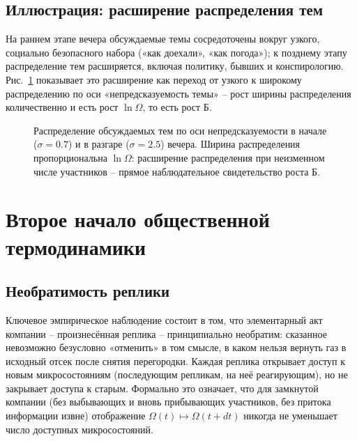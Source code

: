 \documentclass[11pt,a4paper]{article}
\newcommand{\Burm}{\text{Б}}
\begin{document}
\subsection{Иллюстрация: расширение распределения тем}

На раннем этапе вечера обсуждаемые темы сосредоточены вокруг узкого, социально безопасного набора («как доехали», «как погода»); к позднему этапу распределение тем расширяется, включая политику, бывших и конспирологию. Рис.~\ref{fig:distributions} показывает это расширение как переход от узкого к широкому распределению по оси «непредсказуемость темы» -- рост ширины распределения количественно и есть рост $\ln\Omega$, то есть рост $\Burm$.

\begin{figure}[htbp]
\centering
{}
\caption{Распределение обсуждаемых тем по оси непредсказуемости в начале ($\sigma=0.7$) и в разгаре ($\sigma=2.5$) вечера. Ширина распределения пропорциональна $\ln\Omega$: расширение распределения при неизменном числе участников -- прямое наблюдательное свидетельство роста $\Burm$.}
\label{fig:distributions}
\end{figure}

\section{Второе начало общественной термодинамики}

\subsection{Необратимость реплики}

Ключевое эмпирическое наблюдение состоит в том, что элементарный акт компании -- произнесённая реплика -- принципиально необратим: сказанное невозможно безусловно «отменить» в том смысле, в каком нельзя вернуть газ в исходный отсек после снятия перегородки. Каждая реплика открывает доступ к новым микросостояниям (последующим репликам, на неё реагирующим), но не закрывает доступа к старым. Формально это означает, что для замкнутой компании (без выбывающих и вновь прибывающих участников, без притока информации извне) отображение $\Omega(t)\mapsto\Omega(t+dt)$ никогда не уменьшает число доступных микросостояний.
\end{document}
